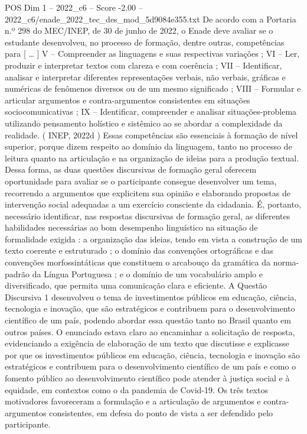 \begin{textsample}{POS Dim 1 – 2022\_c6 – Score -2.00 – 2022\_c6/enade\_2022\_tec\_des\_mod\_5d9084e355.txt}
De acordo com a Portaria n.º 298 do MEC/INEP, de 30 de junho de 2022, o Enade deve avaliar se o estudante desenvolveu, no processo de formação, dentre outras, competências para [ … ] V – Compreender as linguagens e suas respectivas variações ; VI – Ler, produzir e interpretar textos com clareza e com coerência ; VII – Identificar, analisar e interpretar diferentes representações verbais, não verbais, gráficas e numéricas de fenômenos diversos ou de um mesmo significado ; VIII – Formular e articular argumentos e contra-argumentos consistentes em situações sociocomunicativas ; IX – Identificar, compreender e analisar situações-problema utilizando pensamento holístico e sistêmico ao se abordar a complexidade da realidade. ( INEP, 2022d ) Essas competências são essenciais à formação de nível superior, porque dizem respeito ao domínio da linguagem, tanto no processo de leitura quanto na articulação e na organização de ideias para a produção textual.
Dessa forma, as duas questões discursivas de formação geral oferecem oportunidade para avaliar se o participante consegue desenvolver um tema, recorrendo a argumentos que explicitem sua opinião e elaborando propostas de intervenção social adequadas a um exercício consciente da cidadania.
É, portanto, necessário identificar, nas respostas discursivas de formação geral, as diferentes habilidades necessárias ao bom desempenho linguístico na situação de formalidade exigida : a organização das ideias, tendo em vista a construção de um texto coerente e estruturado ; o domínio das convenções ortográficas e das convenções morfossintáticas que constituem o arcabouço da gramática da norma-padrão da Língua Portuguesa ; e o domínio de um vocabulário amplo e diversificado, que permita uma comunicação clara e eficiente.
A Questão Discursiva 1 desenvolveu o tema de investimentos públicos em educação, ciência, tecnologia e inovação, que são estratégicos e contribuem para o desenvolvimento científico de um país, podendo abordar essa questão tanto no Brasil quanto em outros países.
O enunciado estava claro ao encaminhar a solicitação de resposta, evidenciando a exigência de elaboração de um texto que discutisse e explicasse por que os investimentos públicos em educação, ciência, tecnologia e inovação são estratégicos e contribuem para o desenvolvimento científico de um país e como o fomento público ao desenvolvimento científico pode atender à justiça social e à equidade, em contextos como o da pandemia de Covid-19.
Os três textos motivadores favoreceram a formulação e a articulação de argumentos e contra-argumentos consistentes, em defesa do ponto de vista a ser defendido pelo participante.

\end{textsample}
